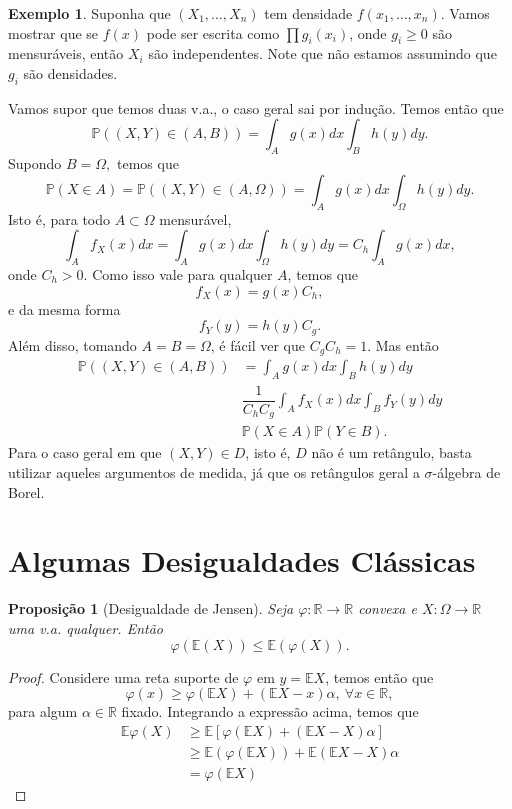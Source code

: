 \documentclass[12pt,a4paper,oneside]{book}
\newtheorem{proposition}[theorem]{Proposi\c{c}\~ao}
\theoremstyle{definition}
\newtheorem{example}[theorem]{Exemplo}
\theoremstyle{remark}
\numberwithin{equation}{section}
\newcommand{\R}{\mathbb{R}}
\newcommand{\E}{\mathbb{E}}
\newcommand{\pr}{\mathbb{P}}
\begin{document}
\begin{example}
Suponha que $(X_1,\dots, X_n)$ tem densidade $f(x_1,\dots,x_n).$ Vamos mostrar que se $f(x)$ pode ser escrita como $\prod g_i(x_i)$, onde $g_i\geq 0$ são mensuráveis, então $X_i$ são independentes. Note que não estamos assumindo que $g_i$ são densidades.

Vamos supor que temos duas v.a., o caso geral sai por indução. Temos então que
$$\pr((X,Y)\in (A,B)) = \int_A g(x)dx \int_B h(y)dy. $$
Supondo $B=\Omega,$ temos que
$$\pr(X\in A) = \pr((X,Y)\in (A,\Omega)) = \int_A g(x)dx \int_\Omega h(y)dy. $$
Isto é, para todo $A\subset \Omega$ mensurável,
$$\int_A f_X(x)dx  =\int_A g(x)dx \int_\Omega h(y)dy =  C_h\int_A g(x)dx, $$
onde $C_h>0.$ Como isso vale para qualquer $A$, temos que
$$f_X(x) = g(x)C_h, $$
e da mesma forma
$$f_Y(y) = h(y)C_g. $$
Além disso, tomando $A=B=\Omega$, é fácil ver que $C_gC_h=1.$
Mas então
\begin{align*}
\pr((X,Y)\in (A,B)) &= \int_A g(x)dx \int_B h(y)dy \\
& \dfrac{1}{C_hC_g}\int_A f_X(x)dx \int_B f_Y(y)dy \\
& \pr(X\in A)\pr(Y\in B).
\end{align*}
Para o caso geral em que $(X,Y)\in D$, isto é, $D$ não é um retângulo, basta utilizar aqueles argumentos de medida, já que os retângulos geral a $\sigma$-álgebra de Borel.
\end{example}





\newpage
\section{Algumas Desigualdades Clássicas}


\begin{proposition}[Desigualdade de Jensen]\label{JensenIneq} Seja $\varphi:\R \rightarrow \R$ convexa e $X:\Omega\rightarrow \R$ uma v.a. qualquer. Então
$$ \varphi(\E(X))\leq \E(\varphi(X)). $$
\end{proposition}
\begin{proof}
Considere uma reta suporte de $\varphi$ em $y=\E X$, temos então que
$$ \varphi(x)\geq \varphi(\E X) + (\E X-x)\alpha,\ \forall x\in \R, $$
para algum $\alpha\in\R$ fixado.
Integrando a expressão acima, temos que
\begin{align*}
\E\varphi(X) &\geq \E[\varphi(\E X) + (\E X-X)\alpha] \\
			 &\geq \E(\varphi(\E X)) + \E(\E X-X)\alpha \\
			 & = \varphi(\E X)
\end{align*}
\end{proof}
\end{document}
